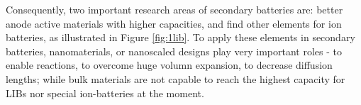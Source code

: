 Consequently, two important research areas of secondary batteries are: better anode active materials with higher capacities, and find other elements for ion batteries, as illustrated in Figure \ref{fig:1lib}. To apply these elements in secondary batteries, nanomaterials, or nanoscaled designs play very important roles - to enable reactions, to overcome huge volumn expansion, to decrease diffusion lengths; while bulk materials are not capable to reach the highest capacity for LIBs nor special ion-batteries at the moment. 

